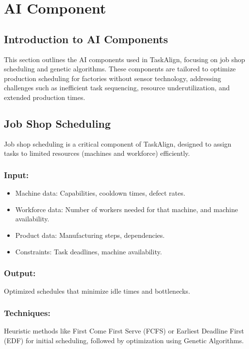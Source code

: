 \section{AI Component}
\label{section:ai-component}

\subsection{Introduction to AI Components}
This section outlines the AI components used in TaskAlign, focusing on job shop scheduling and genetic algorithms. These components are tailored to optimize production scheduling for factories without sensor technology, addressing challenges such as inefficient task sequencing, resource underutilization, and extended production times.

\subsection{Job Shop Scheduling}
Job shop scheduling is a critical component of TaskAlign, designed to assign tasks to limited resources (machines and workforce) efficiently.

\subsubsection*{Input:}
\begin{itemize}
    \item Machine data: Capabilities, cooldown times, defect rates.
    \item Workforce data: Number of workers needed for that machine, and machine availability.
    \item Product data: Manufacturing steps, dependencies.
    \item Constraints: Task deadlines, machine availability.
\end{itemize}

\subsubsection*{Output:}
Optimized schedules that minimize idle times and bottlenecks.

\subsubsection*{Techniques:}
Heuristic methods like First Come First Serve (FCFS) or Earliest Deadline First (EDF) for initial scheduling, followed by optimization using Genetic Algorithms.

